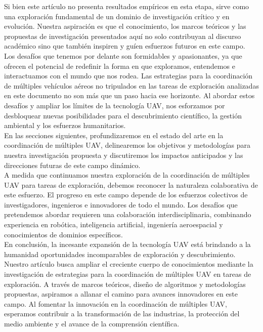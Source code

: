 \documentclass[sigconf]{acmart}
\begin{document}
Si bien este artículo no presenta resultados empíricos en esta etapa, sirve como una exploración fundamental de un dominio de investigación crítico y en evolución. Nuestra aspiración es que el conocimiento, los marcos teóricos y las propuestas de investigación presentados aquí no solo contribuyan al discurso académico sino que también inspiren y guíen esfuerzos futuros en este campo.\\

Los desafíos que tenemos por delante son formidables y apasionantes, ya que ofrecen el potencial de redefinir la forma en que exploramos, entendemos e interactuamos con el mundo que nos rodea. Las estrategias para la coordinación de múltiples vehículos aéreos no tripulados en las tareas de exploración analizadas en este documento no son más que un paso hacia ese horizonte. Al abordar estos desafíos y ampliar los límites de la tecnología UAV, nos esforzamos por desbloquear nuevas posibilidades para el descubrimiento científico, la gestión ambiental y los esfuerzos humanitarios.\\

En las secciones siguientes, profundizaremos en el estado del arte en la coordinación de múltiples UAV, delinearemos los objetivos y metodologías para nuestra investigación propuesta y discutiremos los impactos anticipados y las direcciones futuras de este campo dinámico.\\

A medida que continuamos nuestra exploración de la coordinación de múltiples UAV para tareas de exploración, debemos reconocer la naturaleza colaborativa de este esfuerzo. El progreso en este campo depende de los esfuerzos colectivos de investigadores, ingenieros e innovadores de todo el mundo. Los desafíos que pretendemos abordar requieren una colaboración interdisciplinaria, combinando experiencia en robótica, inteligencia artificial, ingeniería aeroespacial y conocimientos de dominios específicos.\\

En conclusión, la incesante expansión de la tecnología UAV está brindando a la humanidad oportunidades incomparables de exploración y descubrimiento. Nuestro artículo busca ampliar el creciente cuerpo de conocimientos mediante la investigación de estrategias para la coordinación de múltiples UAV en tareas de exploración. A través de marcos teóricos, diseño de algoritmos y metodologías propuestas, aspiramos a allanar el camino para avances innovadores en este campo. Al fomentar la innovación en la coordinación de múltiples UAV, esperamos contribuir a la transformación de las industrias, la protección del medio ambiente y el avance de la comprensión científica.\\
\end{document}
